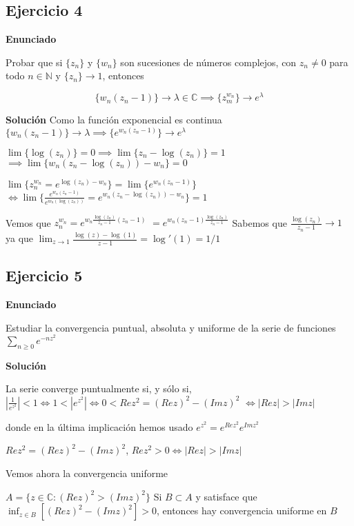 \subsection{Ejercicio 4}
\textbf{Enunciado}

Probar que si $\{z_n\}$ y $\{w_n\}$ son sucesiones de números complejos, con $z_n \not = 0$ para todo
$n\in \mathbb{N}$ y $\{ z_n \} \rightarrow 1$, entonces

$$ \{w_n(z_n-1)\} \rightarrow \lambda\in\mathbb{C} \implies \{ z_m^{w_n} \}\rightarrow e^{\lambda} $$

\textbf{Solución}
Como la función exponencial es continua
$\{ w_n (z_n-1) \} \rightarrow \lambda \implies \{ e^{w_n(z_n-1)} \} \rightarrow e^{\lambda}$

$\lim \{ \log(z_n) \} = 0 \implies \lim \{ z_n-\log(z_n) \} = 1$
$\implies \lim \{ w_n(z_n-\log(z_n))-w_n \} = 0$

$\lim \{ z_n^{w_n} = e^{\log(z_n)-w_n} \}= \lim \{ e^{w_n (z_n-1)} \}$
$\Longleftrightarrow \lim\{ \frac{e^{w_n(z_n-1)}}{e^{w_n (\log(z_n))}} = e^{w_n (z_n-\log(z_n))-w_n} \} = 1$

Vemos que
$z_n^{w_n} = e^{w_n \frac{\log(z_n)}{z_n-1} (z_n-1)}$
$= e^{w_n (z_n-1) \frac{\log(z_n)}{z_n-1}}$
Sabemos que $ \frac{\log(z_n)}{z_n-1} \rightarrow 1$ ya que
$\lim_{z\rightarrow 1} \frac{\log(z)-\log(1)}{z-1} = \log'(1) = 1/1$





\subsection{Ejercicio 5}
\textbf{Enunciado}

Estudiar la convergencia puntual, absoluta y uniforme de la serie de funciones
$\sum_{n\geq 0} e^{-nz^2}$

\textbf{Solución}

La serie converge puntualmente si, y sólo si, $| \frac{1}{e^{z^2}} | <1 \Longleftrightarrow 1<|e^{z^2}|  \Longleftrightarrow 0<Rez^2 = (Rez)^2-(Imz)^2 $
$\Longleftrightarrow |Rez| > |Imz|$

donde en la última implicación hemos usado
$e^{z^2} = e^{Rez^2} e^{Imz^2}$

$Rez^2 = (Rez)^2 - (Imz)^2$,
$Rez^2>0 \Longleftrightarrow |Rez| > |Imz|$


Vemos ahora la convergencia uniforme

$A = \{ z\in\mathbb{C} : (Rez)^2>(Imz)^2 \}$
Si $B\subset A$ y satisface que $\inf_{z\in B} [ (Rez)^2-(Imz)^2 ] > 0$, entonces hay convergencia uniforme en $B$




